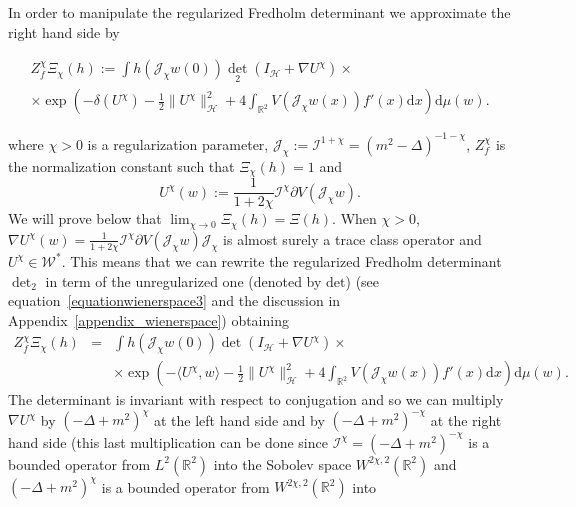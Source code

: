 \documentclass[a4paper,10pt]{article}
\newcommand{\assign}{:=}
\newcommand{\asterisk}{\mathord{*}}
\newcommand{\mathd}{\mathrm{d}}
\begin{document}
In order to manipulate the regularized Fredholm determinant we approximate the
right hand side by

\begin{multline*}
  Z_f^{\chi} \Xi_{\chi} (h) \assign \int h (\mathcal{J}_{\chi} w (0)) \det_2
  (I_{\mathcal{H}} + \nabla U^{\chi}) \times\\
  \times \exp \left( - \delta (U^{\chi}) - \frac{1}{2} \|U^{\chi}
  \|^2_{\mathcal{H}} + 4 \int_{\mathbb{R}^2} V (\mathcal{J}_{\chi} w (x)) f' (x) \mathd x
  \right) \mathd \mu (w) .
\end{multline*}

where $\chi > 0$ is a regularization parameter, $\mathcal{J}_{\chi} \assign
\mathcal{I}^{1 + \chi} = (m^2 - \Delta)^{- 1 - \chi}$, $Z^{\chi}_f$ is the
normalization constant such that $\Xi_{\chi} (h) = 1$ and
\begin{equation}
  U^{\chi} (w) \assign \frac{1}{1 + 2 \chi} \mathcal{I}^{\chi} \partial V
  (\mathcal{J}_{\chi} w) . \label{eq:regularization}
\end{equation}
We will prove below that $\lim_{\chi \rightarrow 0} \Xi_{\chi} (h) = \Xi (h)$.
When $\chi > 0$, $\nabla U^{\chi} (w) = \frac{1}{1 + 2 \chi}
\mathcal{I}^{\chi} \partial V (\mathcal{J}_{\chi} w) \mathcal{J}_{\chi}$ is
almost surely a trace class operator and $U^{\chi} \in
\mathcal{W}^{\asterisk}$. This means that we can rewrite the regularized
Fredholm determinant $\det_2$ in term of the unregularized one (denoted by
$\text{det}$) (see equation~{\eqref{equationwienerspace3}} and the discussion
in Appendix~\ref{appendix_wienerspace}) obtaining
\begin{equation}
  \begin{array}{lll}
    Z_f^{\chi} \Xi_{\chi} (h) & = & \int h (\mathcal{J}_{\chi} w (0)) \det
    (I_{\mathcal{H}} + \nabla U^{\chi}) \times\\
    &  & \times \exp \left( - \langle U^{\chi}, w \rangle - \frac{1}{2}
    \|U^{\chi} \|^2_{\mathcal{H}} + 4 \int_{\mathbb{R}^2} V (\mathcal{J}_{\chi} w (x)) f' (x)
    \mathd x \right) \mathd \mu (w) .
  \end{array} \label{eq:heu1}
\end{equation}
The determinant is invariant with respect to conjugation and so we can
multiply $\nabla U^{\chi}$ by $(- \Delta + m^2)^{\chi}$ at the left
hand side and by $(- \Delta + m^2)^{-\chi}$ at the right hand side (this
last multiplication can be done since $\mathcal{I}^{\chi}=(-\Delta+m^2)^{-\chi}$ is a bounded
operator from $L^2(\mathbb{R}^2)$ into the Sobolev space $W^{2 \chi, 2} (\mathbb{R}^2)$ and $(- \Delta + m^2)^{\chi}$ is a bounded operator from  $W^{2 \chi, 2} (\mathbb{R}^2)$ into
\end{document}
